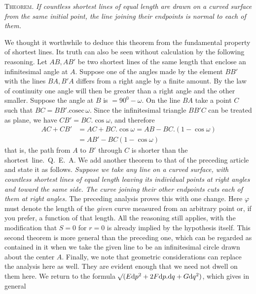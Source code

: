 \par\indent{}%
\textsc{Theorem.} \textit{If countless shortest lines of equal length are drawn on a curved surface from the same initial point, the line joining their endpoints is normal to each of them.}

We thought it worthwhile to deduce this theorem from the fundamental property of shortest lines. Its truth can also be seen without calculation by the following reasoning. Let \(AB,AB'\) be two shortest lines of the same length that enclose an infinitesimal angle at \(A\). Suppose one of the angles made by the element \(BB'\) with the lines \(BA,B'A\) differs from a right angle by a finite amount. By the law of continuity one angle will then be greater than a right angle and the other smaller. Suppose the angle at \(B\) is \(=90^0-\omega\). On the line \(BA\) take a point \(C\) such that \(BC=BB'\mathord{.}\mathrm{cosec}\,\omega\). Since the infinitesimal triangle \(BB'C\) can be treated as plane, we have \(CB'=BC\mathord{.}\cos\omega\), and therefore
\[
\begin{aligned}
AC+CB'&=AC+BC\mathord{.}\cos\omega=AB-BC\mathord{.}(1-\cos\omega)\\
&=AB'-BC(1-\cos\omega)
\end{aligned}
\]
that is, the path from \(A\) to \(B'\) through \(C\) is shorter than the shortest~line.~Q.~E.~A.
We add another theorem to that of the preceding article and state it as follows. \textit{Suppose we take any line on a curved surface, with countless shortest lines of equal length leaving its individual points at right angles and toward the same side. The curve joining their other endpoints cuts each of them at right angles.} The preceding analysis proves this with one change. Here \(\varphi\) must denote the length of the \textit{given} curve measured from an arbitrary point or, if you prefer, a function of that length. All the reasoning still applies, with the modification that \(S=0\) for \(r=0\) is already implied by the hypothesis itself. This second theorem is more general than the preceding one, which can be regarded as contained in it when we take the given line to be an infinitesimal circle drawn about the center \(A\). Finally, we note that geometric considerations can replace the analysis here as well. They are evident enough that we need not dwell on them here.
We return to the formula \(\mathord{{}^{}\!\surd}(E\mathrm{d}p^2+2F\mathrm{d}p\mathord{.}\mathrm{d}q+G\mathrm{d}q^2)\), which gives in general
